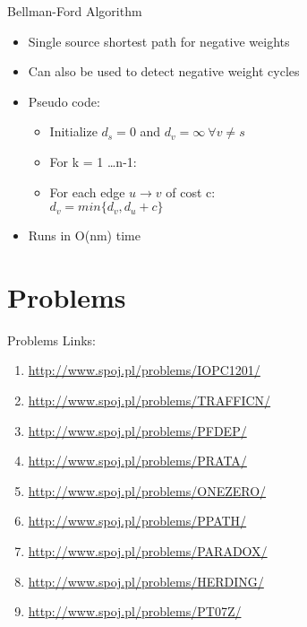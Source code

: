 \documentclass{beamer}
\begin{document}
\begin{frame}[<+->]{Bellman-Ford Algorithm}
\begin{block}{}
  \begin{itemize}
    \item Single source shortest path for negative weights
    \item Can also be used to detect negative weight cycles
    \item Pseudo code:\\
      \begin{itemize}
	\item Initialize $d_s = 0$ and $d_v = \infty\ \forall v \neq s$
	\item For k = 1 \dots n-1:
	\item For each edge $u \rightarrow v$ of cost c:\\
	  \hspace{3mm} $d_v = min\{d_v , d_u + c\}$
      \end{itemize}
    \item Runs in O(nm) time
  \end{itemize}
\end{block}
\end{frame}

\section{Problems}

\begin{frame}{Problems}
Links:
\begin{enumerate}
\item \url{http://www.spoj.pl/problems/IOPC1201/}
\item \url{http://www.spoj.pl/problems/TRAFFICN/}
\item \url{http://www.spoj.pl/problems/PFDEP/}
\item \url{http://www.spoj.pl/problems/PRATA/}
\item \url{http://www.spoj.pl/problems/ONEZERO/}
\item \url{http://www.spoj.pl/problems/PPATH/}
\item \url{http://www.spoj.pl/problems/PARADOX/}
\item \url{http://www.spoj.pl/problems/HERDING/}
\item \url{http://www.spoj.pl/problems/PT07Z/}
\end{enumerate}
\end{frame}
\end{document}
